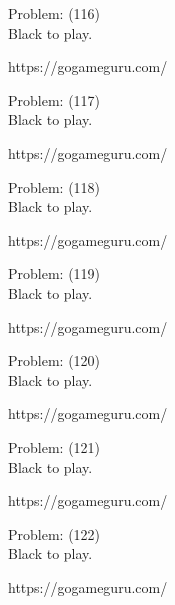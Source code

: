 \documentclass[11pt]{article}
\begin{document}
\begin{minipage}[t]{0.5\textwidth}
  {\centering
  
  Problem: (116)\\
  Black to play.

https://gogameguru.com/\\
  }
\end{minipage}
\begin{minipage}[t]{0.5\textwidth}
  {\centering
  
  Problem: (117)\\
  Black to play.

https://gogameguru.com/\\
  }
\end{minipage}
\begin{minipage}[t]{0.5\textwidth}
  {\centering
  
  Problem: (118)\\
  Black to play.

https://gogameguru.com/\\
  }
\end{minipage}
\begin{minipage}[t]{0.5\textwidth}
  {\centering
  
  Problem: (119)\\
  Black to play.

https://gogameguru.com/\\
  }
\end{minipage}
\begin{minipage}[t]{0.5\textwidth}
  {\centering
  
  Problem: (120)\\
  Black to play.

https://gogameguru.com/\\
  }
\end{minipage}
\begin{minipage}[t]{0.5\textwidth}
  {\centering
  
  Problem: (121)\\
  Black to play.

https://gogameguru.com/\\
  }
\end{minipage}
\begin{minipage}[t]{0.5\textwidth}
  {\centering
  
  Problem: (122)\\
  Black to play.

https://gogameguru.com/\\
  }
\end{minipage}
\end{document}
